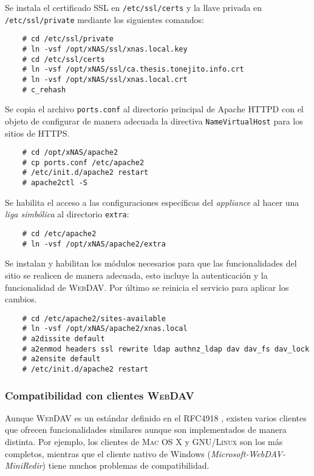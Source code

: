 Se instala el certificado \textsc{\gls{SSL}} en \texttt{/etc/ssl/certs} y la llave privada en \texttt{/etc/ssl/private} mediante los siguientes comandos:

{
\scriptsize
\linespread{1}
\begin{verbatim}
    # cd /etc/ssl/private
    # ln -vsf /opt/xNAS/ssl/xnas.local.key
    # cd /etc/ssl/certs
    # ln -vsf /opt/xNAS/ssl/ca.thesis.tonejito.info.crt
    # ln -vsf /opt/xNAS/ssl/xnas.local.crt
    # c_rehash
\end{verbatim}
}

Se copia el archivo \texttt{ports.conf} al directorio principal de Apache \textsc{HTTPD} con el objeto de configurar de manera adecuada la directiva \texttt{NameVirtualHost} para los sitios de \textsc{\gls{HTTPS}}.

{
\scriptsize
\linespread{1}
\begin{verbatim}
    # cd /opt/xNAS/apache2
    # cp ports.conf /etc/apache2
    # /etc/init.d/apache2 restart
    # apache2ctl -S
\end{verbatim}
}

Se habilita el acceso a las configuraciones espec\'{i}ficas del \textit{appliance} al hacer una \textit{liga simb\'{o}lica} al directorio \texttt{extra}:

{
\scriptsize
\linespread{1}
\begin{verbatim}
    # cd /etc/apache2
    # ln -vsf /opt/xNAS/apache2/extra
\end{verbatim}
}

Se instalan y habilitan los m\'{odulos} necesarios para que las funcionalidades del sitio se realicen de manera adecuada, esto incluye la autenticaci\'{o}n y la funcionalidad de \textsc{\gls{WebDAV}}. Por \'{u}ltimo se reinicia el servicio para aplicar los cambios.

{
\scriptsize
\linespread{1}
\begin{verbatim}
    # cd /etc/apache2/sites-available
    # ln -vsf /opt/xNAS/apache2/xnas.local
    # a2dissite default
    # a2enmod headers ssl rewrite ldap authnz_ldap dav dav_fs dav_lock
    # a2ensite default
    # /etc/init.d/apache2 restart
\end{verbatim}
}

        \subsubsection {Compatibilidad con clientes \textsc{WebDAV}}

Aunque \textsc{\gls{WebDAV}} es un est\'{a}ndar definido en el \textsc{\gls{RFC}}4918 \cite{_rfc_????-2}, existen varios clientes que ofrecen funcionalidades similares aunque son implementados de manera distinta. Por ejemplo, los clientes de \textsc{Mac OS X} y \textsc{GNU/Linux} son los m\'{a}s completos, mientras que el cliente nativo de Windows (\textit{Microsoft-WebDAV-MiniRedir}) tiene muchos problemas de compatibilidad.

